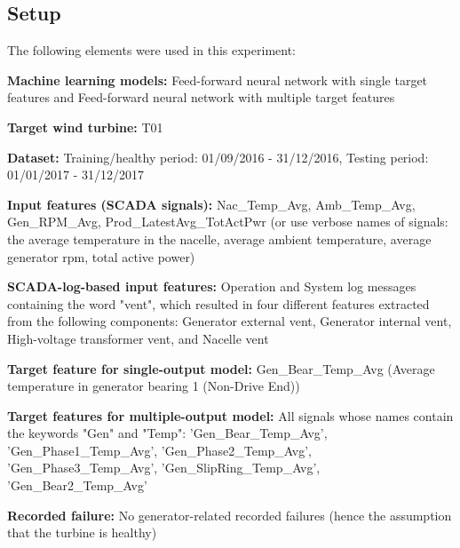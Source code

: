 \subsection{Setup}
The following elements were used in this experiment:
\begin{bulletList}
    \item \textbf{Machine learning models:} Feed-forward neural network with single target features and Feed-forward neural network with multiple target features
    \item \textbf{Target wind turbine:} T01
    \item \textbf{Dataset:} Training/healthy period: 01/09/2016 - 31/12/2016, Testing period: 01/01/2017 - 31/12/2017
    \item \textbf{Input features (SCADA signals):} Nac\_Temp\_Avg, Amb\_Temp\_Avg, Gen\_RPM\_Avg, Prod\_LatestAvg\_TotActPwr (or use verbose names of signals: the average temperature in the nacelle, average ambient temperature, average generator rpm, total active power)
    \item \textbf{SCADA-log-based input features:} Operation and System log messages containing the word "vent", which resulted in four different features extracted from the following components: Generator external vent, Generator internal vent, High-voltage transformer vent, and Nacelle vent
    \item \textbf{Target feature for single-output model: } Gen\_Bear\_Temp\_Avg (Average temperature in generator bearing 1 (Non-Drive End))
    \item \textbf{Target features for multiple-output model:} All signals whose names contain the keywords "Gen" and "Temp": 'Gen\_Bear\_Temp\_Avg', 'Gen\_Phase1\_Temp\_Avg', 'Gen\_Phase2\_Temp\_Avg', 'Gen\_Phase3\_Temp\_Avg', 'Gen\_SlipRing\_Temp\_Avg', 'Gen\_Bear2\_Temp\_Avg'
    \item \textbf{Recorded failure:} No generator-related recorded failures (hence the assumption that the turbine is healthy)
\end{bulletList}

